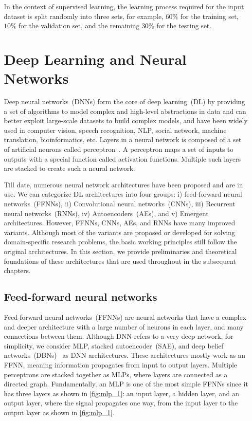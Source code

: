 \hspace*{3.5mm} In the context of supervised learning, the learning process required for the input dataset is split randomly into three sets, for example, $60\%$ for the training set, $10\%$ for the validation set, and the remaining $30\%$ for the testing set.
\fi 

\section{Deep Learning and Neural Networks}
Deep neural networks~(DNNs) form the core of deep learning~(DL) by providing a set of algorithms to model complex and high-level abstractions in data and can better exploit large-scale datasets to build complex models, and have been widely used in computer vision, speech recognition, NLP, social network, machine translation, bioinformatics, etc. Layers in a neural network is composed of a set of artificial neurons called perceptron~\cite{yuan2019adversarial}. A perceptron maps a set of inputs to outputs with a special function called activation functions. Multiple such layers are stacked to create such a neural network. 

\hspace*{3.5mm} Till date, numerous neural network architectures have been proposed and are in use. We can categorize DL architectures into four groups: i) feed-forward neural networks~(FFNNs), ii) Convolutional neural networks~(CNNs), iii) Recurrent neural networks~(RNNs), iv) Autoencoders~(AEs), and v) Emergent architectures. However, FFNNs, CNNs, AEs, and RNNs have many improved variants. Although most of the variants are proposed or developed for solving domain-specific research problems, the basic working principles still follow the original  architectures. In this section, we provide preliminaries and theoretical foundations of these architectures that are used throughout in the subsequent chapters.  

\subsection{Feed-forward neural networks}
Feed-forward neural networks~(FFNNs) are neural networks that have a complex and deeper architecture with a large number of neurons in each layer, and many connections between them. Although DNN refers to a very deep network, for simplicity, we consider MLP, stacked autoencoder~(SAE), and deep belief networks~(DBNs)~\cite{Hinton:2009} as DNN architectures. These architectures mostly work as an FFNN, meaning information propagates from input to output layers. Multiple perceptrons are stacked together as MLPs, where layers are connected as a directed graph. Fundamentally, an MLP is one of the most simple FFNNs since it has three layers as shown in \cref{fig:mlp_1}: an input layer, a hidden layer, and an output layer, where the signal propagates one way, from the input layer to the output layer as shown in \cref{fig:mlp_1}.


